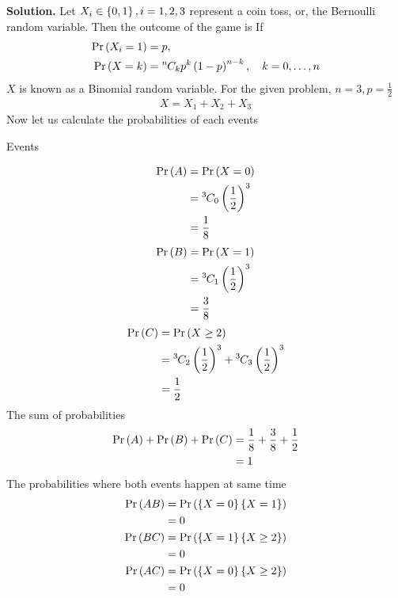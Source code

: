 \documentclass[journal,12pt,twocolumn]{IEEEtran}
\begin{document}
	\textbf{Solution.}
	Let $X_i\in \left\{0,1\right\}, i = 1, 2, 3$ represent a coin toss, or, the Bernoulli random variable.  Then the outcome of the game is
	If 
	\begin{align}
		\Pr\left(X_i = 1\right) &= p,
		\\
		\Pr\left(X = k\right) &= {{}^{n}\mkern-1muC_{k}}p^k\left(1-p\right)^{n-k}, \quad k = 0,\dots, n
	\end{align}
	$X$ is known as a Binomial random variable.  For the given problem, $n = 3, p = \frac{1}{2}$
		\begin{align}
		X = X_1+X_2+X_3	
	\end{align}
Now let us calculate the probabilities of each events
	\begin{table}[ht!]
		\centering
		
		\caption{Events}
		\label{Table:1}
	\end{table}
	\begin{align}
		\Pr\left(A\right)&=\Pr\left(X=0\right)
		\\
	     	  &={{}^{3}\mkern-1muC_{0}}\left(\frac{1}{2}\right)^3 
	     	  \\
	     	  &=\frac{1}{8}
	\end{align}
	\begin{align}     	  	
	    \Pr\left(B\right)&=\Pr\left(X=1\right)\\
	          &={{}^{3}\mkern-1muC_{1}}\left(\frac{1}{2}\right)^3 \\
	          &=\frac{3}{8}
	\end{align}
	\begin{align}	          		        
	    \Pr\left(C\right)&= \Pr\left(X \ge 2\right) \\
	    &= {{}^{3}\mkern-1muC_{2}}\left(\frac{1}{2}\right)^3+{{}^{3}\mkern-1muC_{3}}\left(\frac{1}{2}\right)^3
	    \\
	    &= \frac{1}{2}
	\end{align}
    The sum of probabilities
    \begin{align}
	    \Pr\left(A\right)+\Pr\left(B\right)+\Pr\left(C\right)&=\frac{1}{8}+\frac{3}{8}+ \frac{1}{2}\\
	                        &=1\label{eq:eq14}
	\end{align}
The probabilities where both events happen at same time
\begin{align}
	\Pr\left(AB\right)&=\Pr\left(\left\{X=0\right\}\left\{X=1\right\}\right)\\
	       &=0\label{eq:eq16}\\
	 \Pr\left(BC\right)&=\Pr\left(\left\{X=1\right\}\left\{X\ge2\right\}\right)\\
	 &=0\label{eq:eq18}\\
	 \Pr\left(AC\right)&=\Pr\left(\left\{X=0\right\}\left\{X\ge2\right\}\right)\\
	 &=0\label{eq:eq20}
\end{align}
\end{document}
